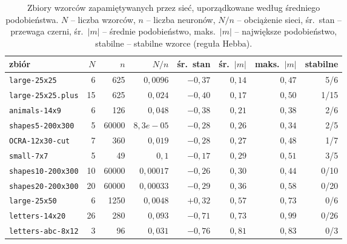 \begin{table}[htbp]
\centering
\small
\setlength{\tabcolsep}{4pt}
\begin{tabular}{lrrrrrrr}
\toprule
zbiór & $N$ & $n$ & $N/n$ & śr.\ stan & śr.\ $|m|$ & maks.\ $|m|$ & stabilne \\
\midrule
\texttt{large-25x25} & 6 & 625 & $0{,}0096$ & $-0{,}37$ & $0{,}14$ & $0{,}47$ & 5/6 \\
\texttt{large-25x25.plus} & 15 & 625 & $0{,}024$ & $-0{,}40$ & $0{,}17$ & $0{,}50$ & 1/15 \\
\texttt{animals-14x9} & 6 & 126 & $0{,}048$ & $-0{,}38$ & $0{,}21$ & $0{,}38$ & 2/6 \\
\texttt{shapes5-200x300} & 5 & 60000 & $8{,}3e-05$ & $-0{,}28$ & $0{,}26$ & $0{,}34$ & 2/5 \\
\texttt{OCRA-12x30-cut} & 7 & 360 & $0{,}019$ & $-0{,}28$ & $0{,}27$ & $0{,}48$ & 1/7 \\
\texttt{small-7x7} & 5 & 49 & $0{,}1$ & $-0{,}17$ & $0{,}29$ & $0{,}51$ & 3/5 \\
\texttt{shapes10-200x300} & 10 & 60000 & $0{,}00017$ & $-0{,}26$ & $0{,}30$ & $0{,}44$ & 0/10 \\
\texttt{shapes20-200x300} & 20 & 60000 & $0{,}00033$ & $-0{,}29$ & $0{,}36$ & $0{,}58$ & 0/20 \\
\texttt{large-25x50} & 6 & 1250 & $0{,}0048$ & $+0{,}32$ & $0{,}57$ & $0{,}73$ & 0/6 \\
\texttt{letters-14x20} & 26 & 280 & $0{,}093$ & $-0{,}71$ & $0{,}73$ & $0{,}99$ & 0/26 \\
\texttt{letters-abc-8x12} & 3 & 96 & $0{,}031$ & $-0{,}76$ & $0{,}81$ & $0{,}83$ & 0/3 \\
\bottomrule
\end{tabular}
\caption{Zbiory wzorców zapamiętywanych przez sieć, uporządkowane według średniego podobieństwa.
 $N$ -- liczba wzorców, $n$ -- liczba neuronów, $N/n$ -- obciążenie sieci,
 śr.\ stan -- przewaga czerni, śr.\ $|m|$ -- średnie podobieństwo,
 maks.\ $|m|$ -- największe podobieństwo, stabilne -- stabilne wzorce (reguła Hebba).}
\label{tab:zbiory}
\end{table}
